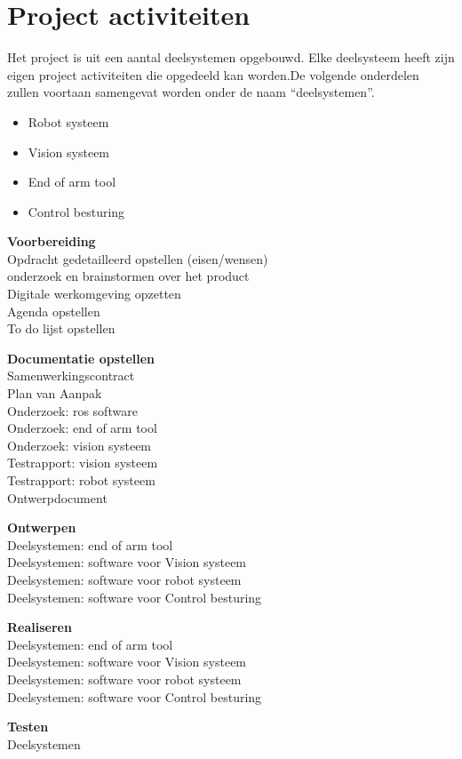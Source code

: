 
	
\begin{figure}[h]
\end{figure}

\section{Project activiteiten}

Het project is uit een aantal deelsystemen opgebouwd. Elke deelsysteem heeft zijn eigen project activiteiten die opgedeeld kan worden.De volgende onderdelen zullen voortaan samengevat worden onder de naam “deelsystemen”.

\begin{itemize}
 \item Robot systeem
 \item Vision systeem
 \item End of arm tool
 \item Control besturing
\end{itemize}

\vspace{5mm}
\textbf{Voorbereiding}
\\Opdracht gedetailleerd opstellen (eisen/wensen)
\\onderzoek en brainstormen over het product
\\Digitale werkomgeving opzetten
\\Agenda opstellen
\\To do lijst opstellen

\vspace{5mm} 
\textbf{Documentatie opstellen}
\\Samenwerkingscontract
\\Plan van Aanpak
\\Onderzoek: ros software
\\Onderzoek: end of arm tool
\\Onderzoek: vision systeem
\\Testrapport: vision systeem
\\Testrapport: robot systeem
\\Ontwerpdocument

\vspace{5mm}
\textbf{Ontwerpen}
\\Deelsystemen: end of arm tool
\\Deelsystemen: software voor Vision systeem
\\Deelsystemen: software voor robot systeem
\\Deelsystemen: software voor Control besturing

\vspace{5mm}
\textbf{Realiseren}
\\Deelsystemen: end of arm tool
\\Deelsystemen: software voor Vision systeem
\\Deelsystemen: software voor robot systeem
\\Deelsystemen: software voor Control besturing

\vspace{5mm}
\textbf{Testen}
\\Deelsystemen

\newpage
	

